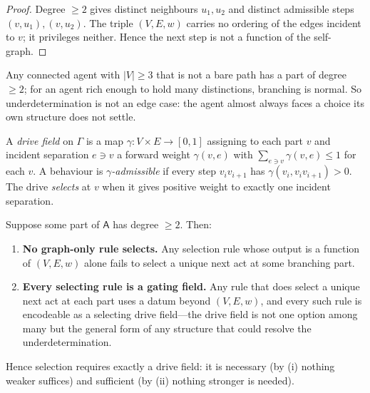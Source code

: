 \documentclass[11pt,twocolumn,a4paper]{article}
\newcommand{\Agent}{\mathsf{A}}
\newcommand{\Self}{\Gamma}          %
\newcommand{\V}{V}
\newcommand{\E}{E}
\newcommand{\wt}{w}
\newcommand{\drive}{\gamma}          %
\newcommand{\abs}[1]{\lvert#1\rvert}
\begin{document}
\begin{proof}
Degree $\ge2$ gives distinct neighbours $u_1,u_2$ and distinct admissible
steps $(v,u_1),(v,u_2)$. The triple $(\V,\E,\wt)$ carries no ordering of
the edges incident to $v$; it privileges neither. Hence the next step is
not a function of the self-graph.
\end{proof}

\begin{remark}
Any connected agent with $\abs{\V}\ge3$ that is not a bare path has a part
of degree $\ge2$; for an agent rich enough to hold many distinctions,
branching is normal. So underdetermination is not an edge case: the agent
almost always faces a choice its own structure does not settle.
\end{remark}

\begin{definition}
\label{def:drive}
A \emph{drive field} on $\Self$ is a map $\drive:\V\times\E\to[0,1]$
assigning to each part $v$ and incident separation $e\ni v$ a forward
weight $\drive(v,e)$ with $\sum_{e\ni v}\drive(v,e)\le1$ for each $v$. A
behaviour is \emph{$\drive$-admissible} if every step $v_iv_{i+1}$ has
$\drive(v_i,v_iv_{i+1})>0$. The drive \emph{selects} at $v$ when it gives
positive weight to exactly one incident separation.
\end{definition}

\begin{theorem}
\label{thm:drive}
Suppose some part of $\Agent$ has degree $\ge2$. Then:
\begin{enumerate}[label=\textup{(\roman*)},leftmargin=2.2em]
\item \textbf{No graph-only rule selects.} Any selection rule whose output
is a function of $(\V,\E,\wt)$ alone fails to select a unique next act at
some branching part.
\item \textbf{Every selecting rule is a gating field.} Any rule that does
select a unique next act at each part uses a datum beyond $(\V,\E,\wt)$,
and every such rule is encodeable as a selecting drive field---the drive
field is not one option among many but the general form of any structure
that could resolve the underdetermination.
\end{enumerate}
Hence selection requires exactly a drive field: it is necessary
(by (i) nothing weaker suffices) and sufficient (by (ii) nothing stronger
is needed).
\end{theorem}
\end{document}
